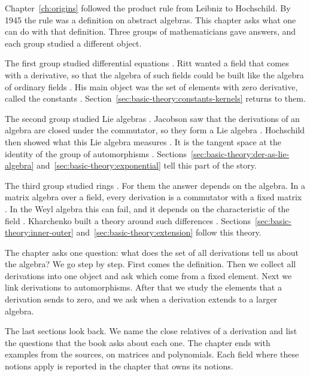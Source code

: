 
Chapter~\ref{ch:origins} followed the product rule from Leibniz to Hochschild.
By 1945 the rule was a definition on abstract algebras. This chapter asks what
one can do with that definition. Three groups of mathematicians gave answers,
and each group studied a different object.

The first group studied differential equations \cite[p.~1]{Ritt1950}. Ritt
wanted a field that comes with a derivative, so that the algebra of such
fields could be built like the algebra of ordinary fields
\cite[p.~1]{Ritt1950}. His main object was the set of elements with zero
derivative, called the constants \cite[p.~1]{Ritt1950}.
Section~\ref{sec:basic-theory:constants-kernels} returns to them.

The second group studied Lie algebras \cite[p.~207]{Jacobson1937}. Jacobson
saw that the derivations of an algebra are closed under the commutator, so
they form a Lie algebra \cite[p.~207]{Jacobson1937}. Hochschild then showed
what this Lie algebra measures \cite[pp.~677--678]{Hochschild1942}. It is the
tangent space at the identity of the group of automorphisms
\cite[pp.~677--678]{Hochschild1942}.
Sections~\ref{sec:basic-theory:der-as-lie-algebra}
and~\ref{sec:basic-theory:exponential} tell this part of the story.

The third group studied rings \cite{Kharchenko1991}. For them the answer
depends on the algebra. In a matrix algebra over a field, every derivation is
a commutator with a fixed matrix
\cite[Corollary~6.2]{BresarHanselkaKlepVolcic2018}. In the Weyl algebra this
can fail, and it depends on the characteristic of the field
\cite[p.~48]{BenkartLopesOndrus2015}. Kharchenko built a theory around such
differences \cite{Kharchenko1991}. Sections~\ref{sec:basic-theory:inner-outer}
and~\ref{sec:basic-theory:extension} follow this theory.

The chapter asks one question: what does the set of all derivations tell us
about the algebra? We go step by step. First comes the definition. Then we
collect all derivations into one object and ask which come from a fixed
element. Next we link derivations to automorphisms. After that we study the
elements that a derivation sends to zero, and we ask when a derivation extends
to a larger algebra.

The last sections look back. We name the close relatives of a derivation and
list the questions that the book asks about each one. The chapter ends with
examples from the sources, on matrices and polynomials. Each field where these
notions apply is reported in the chapter that owns its notions.

